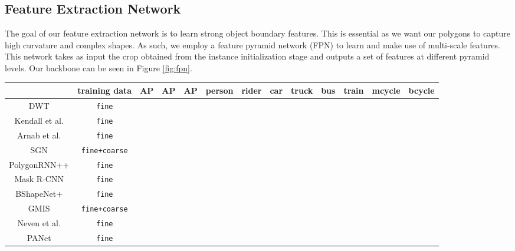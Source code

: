 \documentclass[10pt,twocolumn,letterpaper]{article}
\begin{document}
\subsection{Feature Extraction Network}
\label{sec:fpn}
The goal of our feature extraction network is to learn strong object boundary features. This is essential as we want our polygons to capture high curvature and complex shapes. As such, we employ a feature pyramid network (FPN) \cite{fpn} to learn and make use of multi-scale features. This network takes as input the  crop obtained from the instance initialization stage and outputs a set of features at different pyramid levels. Our backbone can be seen in Figure \ref{fig:fpn}.



\setlength{\tabcolsep}{2pt}

\begin{table*}[t!]
\vspace{-0.5cm}
\setlength{\tabcolsep}{2pt}
\centering
  \begin{tabular}{|c|c|c|cc|cccccccc|}
  \cline{2-13}
  \multicolumn{1}{c|}{} & \multicolumn{1}{c|}{training data} &  \multicolumn{1}{c|}{AP} & \multicolumn{1}{c}{AP} & AP & \multicolumn{1}{c}{person}& \multicolumn{1}{c}{rider} & \multicolumn{1}{c}{car} & \multicolumn{1}{c}{truck} & \multicolumn{1}{c}{bus} & \multicolumn{1}{c}{train} & \multicolumn{1}{c}{mcycle} & bcycle \\ 
  \hline 


  DWT \cite{bai2017deep}  & \texttt{fine} & & & & & & & & & & & \\
  Kendall et al. \cite{Kendall_2018_CVPR}  & \texttt{fine} & & & & & & & & & & & \\
  Arnab et al. \cite{ArnabT17}  & \texttt{fine}  & & & & & & & & & & &\\
  SGN \cite{liu2017sgn}  & \texttt{fine+coarse} & & & 
    & & & & & & & & \\
  PolygonRNN++ \cite{polygon-rnn++}  & \texttt{fine} & & & & & & & & & & & \\
  Mask R-CNN \cite{mask-rcnn} & \texttt{fine} & & & & & & & & & & & \\
  BShapeNet+ \cite{bshapenet} & \texttt{fine} &  & &
    & & & & & & & & \\
  GMIS  \cite{Liu2018AffinityDA}  & \texttt{fine+coarse} &  &  & & & & & & & & & \\
  Neven et al.  \cite{Neven_2019_CVPR}  & \texttt{fine} &  &  & & & & & & & & & \\
  PANet  \cite{panet}  & \texttt{fine} &  & & & & & & & & & & \\



\end{tabular}
\end{table*}
\end{document}
